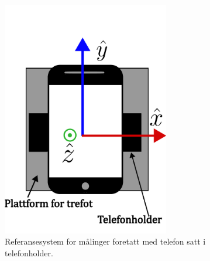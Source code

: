 \begin{figure}
    \centering
    \includegraphics[width=0.65\textwidth]{img/Plattform med telefoni.pdf}
    \caption{Referansesystem for målinger foretatt med telefon satt i telefonholder.}
    \label{fig:telf_akser}
\end{figure}
